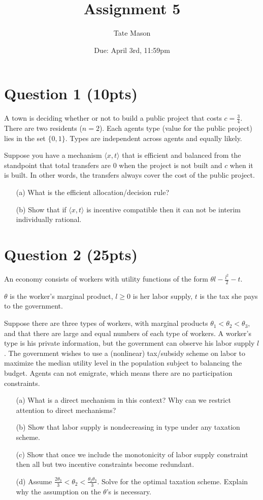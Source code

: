 \documentclass[10pt,a4paper]{article}
\begin{document}
\title{Assignment 5}
\author{Tate Mason}
\date{Due: April 3rd, 11:59pm}
\maketitle

\section*{Question 1 (10pts)}
  A town is deciding whether or not to build a public project that costs $c = \frac{3}{4}$. There are two residents ($n = 2$). Each agents type (value for the public project) lies in the set $\{0,1\}$. Types are independent across agents and equally likely.

  Suppose you have a mechanism $\langle x, t \rangle$ that is efficient and balanced from the standpoint that total transfers are 0 when the project is not built and $c$ when it is built. In other words, the transfers always cover the cost of the public project.

  \begin{enumerate}
      \item[(a)] What is the efficient allocation/decision rule?
      \item[(b)] Show that if $\langle x, t \rangle$ is incentive compatible then it can not be interim individually rational.
  \end{enumerate}

\section*{Question 2 (25pts)}
  An economy consists of workers with utility functions of the form $\theta l - \frac{l^2}{2} - t$.

  $\theta$ is the worker's marginal product, $l \geq 0$ is her labor supply, $t$ is the tax she pays to the government.

  Suppose there are three types of workers, with marginal products $\theta_1 < \theta_2 < \theta_3$, and that there are large and equal numbers of each type of workers. A worker's type is his private information, but the government can observe his labor supply $l$. The government wishes to use a (nonlinear) tax/subsidy scheme on labor to maximize the median utility level in the population subject to balancing the budget. Agents can not emigrate, which means there are no participation constraints.

  \begin{enumerate}
      \item[(a)] What is a direct mechanism in this context? Why can we restrict attention to direct mechanisms?
      \item[(b)] Show that labor supply is nondecreasing in type under any taxation scheme.
      \item[(c)] Show that once we include the monotonicity of labor supply constraint then all but two incentive constraints become redundant.
      \item[(d)] Assume $\frac{2\theta_3}{3} < \theta_2 < \frac{\theta_2\theta_3}{3}$. Solve for the optimal taxation scheme. Explain why the assumption on the $\theta$'s is necessary.
  \end{enumerate}
\end{document}
